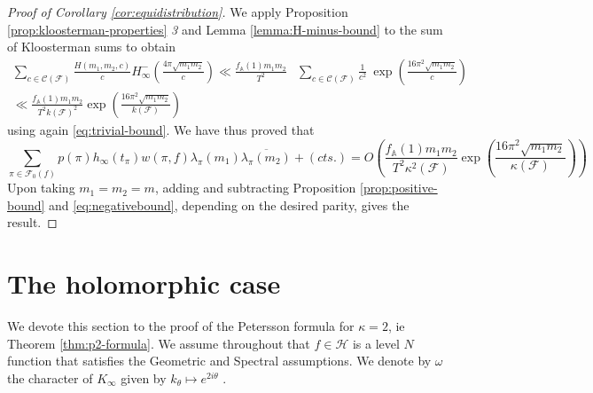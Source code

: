 \documentclass{article}
\numberwithin{equation}{section}
\begin{document}
\begin{proof}[Proof of Corollary \ref{cor:equidistribution}]
    We apply Proposition \ref{prop:kloosterman-properties} \emph{3} and Lemma \ref{lemma:H-minus-bound} to the sum of Kloosterman sums to obtain
    \begin{equation}
    \begin{split}
        \sum_{c\in \mathcal{C}(\mathcal{F})}\frac{H(m_1,m_2,c)}{c}H_\infty^- \left( \frac{4\pi \sqrt{m_1m_2}}{c}\right) \ll \frac{f_\mathbb{A}(1)m_1m_2}{T^2} & \sum_{c\in \mathcal{C}(\mathcal{F})} \frac{1}{c^2} \ \exp\left(\frac{16\pi^2 \sqrt{m_1 m_2}}{c}\right)\\
        \ll \frac{f_\mathbb{A}(1)m_1m_2}{T^2 k(\mathcal{F})^2}\exp\left(\frac{16\pi^2\sqrt{m_1m_2}}{k(\mathcal{F})}\right)
    \end{split}
    \end{equation}
    using again \eqref{eq:trivial-bound}. We have thus proved that
    \begin{equation}\label{eq:negativebound}
    \sum_{\pi \in \mathcal{F}_0(f)}p(\pi)h_\infty(t_\pi)w(\pi,f)\lambda_\pi(m_1)\overline{\lambda_\pi(m_2)}+(cts.)=O\left(\frac{f_\mathbb{A}(1)m_1m_2}{T^2 \kappa^2(\mathcal{F})}\exp\left(\frac{16\pi^2\sqrt{m_1m_2}}{\kappa(\mathcal{F})}\right) \right)
    \end{equation}
    Upon taking $m_1=m_2=m$, adding and subtracting Proposition \ref{prop:positive-bound} and \eqref{eq:negativebound}, depending on the desired parity, gives the result.
\end{proof}
 
\section{The holomorphic case}\label{section:holomorphic}
We devote this section to the proof of the Petersson formula for $\kappa=2$, ie Theorem \ref{thm:p2-formula}. We assume throughout that $f \in \mathcal{H}$ is a level $N$ function that satisfies the Geometric and Spectral assumptions. We denote by $\omega$ the character of $K_\infty$ given by $k_\theta \mapsto e^{2i\theta}$ .
\end{document}
